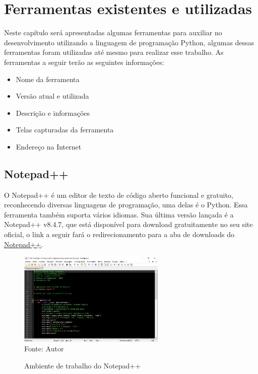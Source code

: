 

\chapter{Ferramentas existentes e utilizadas}

Neste capítulo será apresentadas algumas ferramentas para auxiliar no desenvolvimento utilizando a linguagem de programação Python, algumas dessas ferramentas foram utilizadas até mesmo para realizar esse trabalho. As ferramentas a seguir terão as seguintes informações:
\begin{itemize}
  \item Nome da ferramenta
  \item Versão atual e utilizada
  \item Descrição e informações
  \item Telas capturadas da ferramenta
  \item Endereço na Internet
\end{itemize}

    \section{Notepad++}
	O Notepad++ é um editor de texto de código aberto funcional e gratuito, reconhecendo diversas linguagens de programação, uma delas é o Python. Essa ferramenta também suporta vários idiomas. Sua última versão lançada é a Notepad++ v8.4.7, que está disponível para download gratuitamente no seu site oficial, o link a seguir fará o redirecionamento para a aba de downloads do \href{https://notepad-plus-plus.org/downloads/}{Notepad++}. 
	
	\begin{figure}[H]
		\begin{center}
			\caption{Ambiente de trabalho do Notepad++} \label{ling1}
			\includegraphics[width=7cm]{notepad.JPG} \\
			{\tiny \sf Fonte:{ Autor}}
		\end{center}
	\end{figure}
	

